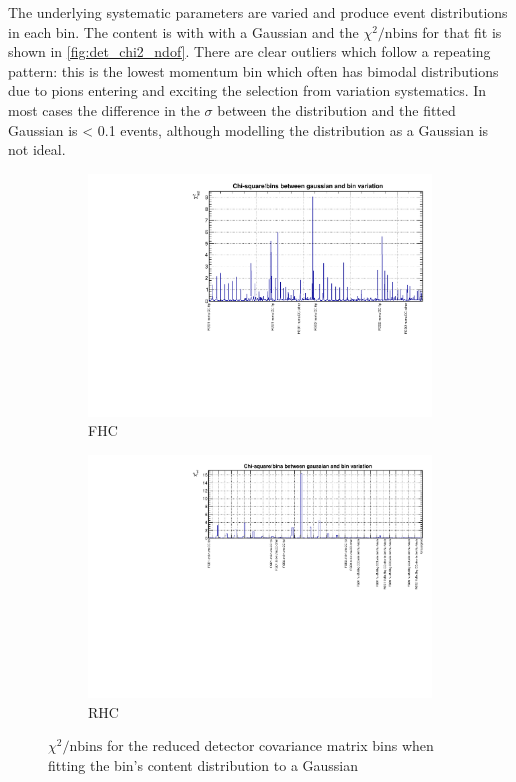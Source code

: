 The underlying systematic parameters are varied and produce event distributions in each \pmu \cosmu bin. The content is with with a Gaussian and the $\chi^2/\text{nbins}$ for that fit is shown in \autoref{fig:det_chi2_ndof}. There are clear outliers which follow a repeating pattern: this is the lowest momentum bin which often has bimodal distributions due to pions entering and exciting the selection from variation systematics. In most cases the difference in the $\sigma$ between the distribution and the fitted Gaussian is < 0.1 events, although modelling the distribution as a Gaussian is not ideal.
\begin{figure}[h]
	\begin{subfigure}[t]{0.7\textwidth}
		\includegraphics[width=\textwidth,page=1, trim={0mm 0mm 0mm 0mm}, clip]{figures/det/fhc_v7_chi2ndof}
		\caption{FHC}
	\end{subfigure}

	\begin{subfigure}[t]{0.7\textwidth}
		\includegraphics[width=\textwidth,page=1, trim={0mm 0mm 0mm 0mm}, clip]{figures/det/rhc_v7_chi2ndof}
		\caption{RHC}
	\end{subfigure}
\caption{$\chi^2/\text{nbins}$ for the reduced detector covariance matrix bins when fitting the bin's content distribution to a Gaussian}
\label{fig:det_chi2_ndof}
\end{figure}

